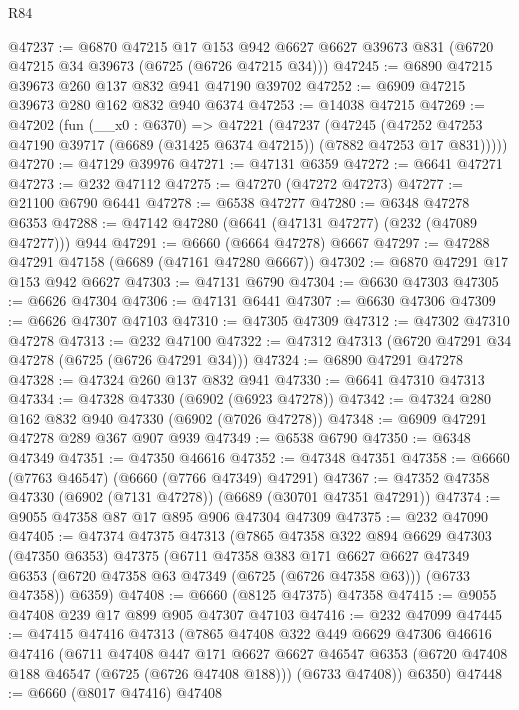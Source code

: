 \begin{lexlean}{R84}
\begin{coremodule}
@47237 := @6870
    @47215
    @17
    @153
    @942
    @6627
    @6627
    @39673
    @831
    (@6720 @47215 @34 @39673 (@6725 (@6726 @47215 @34)))
@47245 := @6890 @47215 @39673 @260 @137 @832 @941 @47190 @39702
@47252 := @6909 @47215 @39673 @280 @162 @832 @940 @6374
@47253 := @14038 @47215
@47269 := @47202
    (fun (__x0 : @6370) =>
    @47221
      (@47237
        (@47245
          (@47252 @47253 @47190 @39717 (@6689 (@31425 @6374 @47215)) (@7882 @47253 @17 @831)))))
@47270 := @47129 @39976
@47271 := @47131 @6359
@47272 := @6641 @47271
@47273 := @232 @47112
@47275 := @47270 (@47272 @47273)
@47277 := @21100 @6790 @6441
@47278 := @6538 @47277
@47280 := @6348 @47278 @6353
@47288 := @47142 @47280 (@6641 (@47131 @47277) (@232 (@47089 @47277))) @944
@47291 := @6660 (@6664 @47278) @6667
@47297 := @47288 @47291 @47158 (@6689 (@47161 @47280 @6667))
@47302 := @6870 @47291 @17 @153 @942 @6627
@47303 := @47131 @6790
@47304 := @6630 @47303
@47305 := @6626 @47304
@47306 := @47131 @6441
@47307 := @6630 @47306
@47309 := @6626 @47307 @47103
@47310 := @47305 @47309
@47312 := @47302 @47310 @47278
@47313 := @232 @47100
@47322 := @47312 @47313 (@6720 @47291 @34 @47278 (@6725 (@6726 @47291 @34)))
@47324 := @6890 @47291 @47278
@47328 := @47324 @260 @137 @832 @941
@47330 := @6641 @47310 @47313
@47334 := @47328 @47330 (@6902 (@6923 @47278))
@47342 := @47324 @280 @162 @832 @940 @47330 (@6902 (@7026 @47278))
@47348 := @6909 @47291 @47278 @289 @367 @907 @939
@47349 := @6538 @6790
@47350 := @6348 @47349
@47351 := @47350 @46616
@47352 := @47348 @47351
@47358 := @6660 (@7763 @46547) (@6660 (@7766 @47349) @47291)
@47367 := @47352 @47358 @47330 (@6902 (@7131 @47278)) (@6689 (@30701 @47351 @47291))
@47374 := @9055 @47358 @87 @17 @895 @906 @47304 @47309
@47375 := @232 @47090
@47405 := @47374
    @47375
    @47313
    (@7865
      @47358
      @322
      @894
      @6629
      @47303
      (@47350 @6353)
      @47375
      (@6711
        @47358
        @383
        @171
        @6627
        @6627
        @47349
        @6353
        (@6720 @47358 @63 @47349 (@6725 (@6726 @47358 @63)))
        (@6733 @47358))
      @6359)
@47408 := @6660 (@8125 @47375) @47358
@47415 := @9055 @47408 @239 @17 @899 @905 @47307 @47103
@47416 := @232 @47099
@47445 := @47415
    @47416
    @47313
    (@7865
      @47408
      @322
      @449
      @6629
      @47306
      @46616
      @47416
      (@6711
        @47408
        @447
        @171
        @6627
        @6627
        @46547
        @6353
        (@6720 @47408 @188 @46547 (@6725 (@6726 @47408 @188)))
        (@6733 @47408))
      @6350)
@47448 := @6660 (@8017 @47416) @47408

\end{coremodule}
\end{lexlean}
